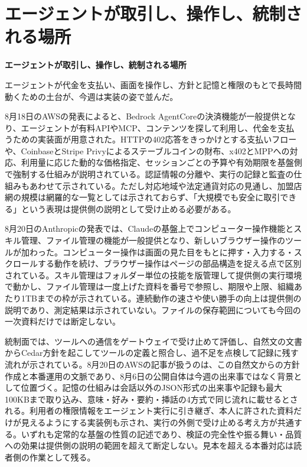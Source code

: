\section{エージェントが取引し、操作し、統制される場所}
\begin{wideflow}
{\Large\bfseries エージェントが取引し、操作し、統制される場所}\par
\smallskip
{\color{SurveyMuted}エージェントが代金を支払い、画面を操作し、方針と記憶と権限のもとで長時間動くための土台が、今週は実装の姿で並んだ。}\par
\end{wideflow}

\noindent 8月18日のAWSの発表によると、Bedrock AgentCoreの決済機能が一般提供となり、エージェントが有料APIやMCP、コンテンツを探して利用し、代金を支払うための実装面が用意された。HTTPの402応答をきっかけとする支払いフローや、CoinbaseとStripe Privyによるステーブルコインの財布、x402とMPPへの対応、利用量に応じた動的な価格指定、セッションごとの予算や有効期限を基盤側で強制する仕組みが説明されている。認証情報の分離や、実行の記録と監査の仕組みもあわせて示されている。ただし対応地域や法定通貨対応の見通し、加盟店網の規模は網羅的な一覧としては示されておらず、「大規模でも安全に取引できる」という表現は提供側の説明として受け止める必要がある。 \cite{w2026w34w34eventc010}\par\medskip

\noindent 8月20日のAnthropicの発表では、Claudeの基盤上でコンピューター操作機能とスキル管理、ファイル管理の機能が一般提供となり、新しいブラウザー操作のツールが加わった。コンピューター操作は画面の見た目をもとに押す・入力する・スクロールする動作を続け、ブラウザー操作はページの部品構造を捉える点で区別されている。スキル管理はフォルダー単位の技能を版管理して提供側の実行環境で動かし、ファイル管理は一度上げた資料を番号で参照し、期限や上限、組織あたり1TBまでの枠が示されている。連続動作の速さや使い勝手の向上は提供側の説明であり、測定結果は示されていない。ファイルの保存範囲についても今回の一次資料だけでは断定しない。 \cite{w2026w34w34eventc011}\par\medskip

\noindent 統制面では、ツールへの通信をゲートウェイで受け止めて評価し、自然文の文書からCedar方針を起こしてツールの定義と照合し、過不足を点検して記録に残す流れが示されている。8月20日のAWSの記事が扱うのは、この自然文からの方針作成と本番運用の文脈であり、8月6日の公開自体は今週の出来事ではなく背景として位置づく。記憶の仕組みは会話以外のJSON形式の出来事や記録も最大100KBまで取り込み、意味・好み・要約・挿話の4方式で同じ流れに載せるとされる。利用者の権限情報をエージェント実行に引き継ぎ、本人に許された資料だけが見えるようにする実装例も示され、実行の外側で受け止める考え方が共通する。いずれも定常的な基盤の性質の記述であり、検証の完全性や振る舞い・品質への効果は提供側の説明の範囲を超えて断定しない。見本を超える本番対応は読者側の作業として残る。 \cite{w2026w34w34eventc087,w2026w34w34eventc031,w2026w34w34eventgapawsagentcorememoryjson,w2026w34w34eventc104}\par\medskip

